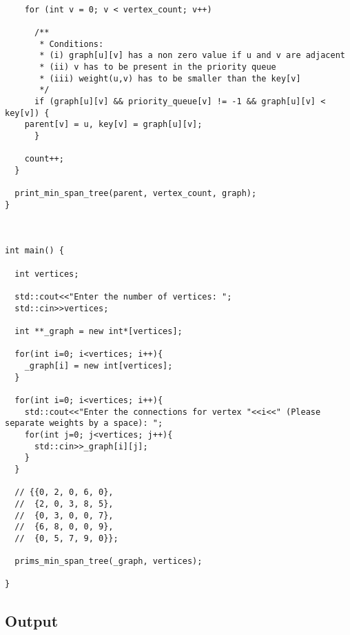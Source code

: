 \documentclass{article}
\begin{document}
\begin{verbatim}
  
    for (int v = 0; v < vertex_count; v++)

      /**
       * Conditions:
       * (i) graph[u][v] has a non zero value if u and v are adjacent
       * (ii) v has to be present in the priority queue
       * (iii) weight(u,v) has to be smaller than the key[v]
       */
      if (graph[u][v] && priority_queue[v] != -1 && graph[u][v] < key[v]) {
	parent[v] = u, key[v] = graph[u][v];
      }
	
    count++;
  } 
  
  print_min_span_tree(parent, vertex_count, graph); 
} 
  
  

int main() {

  int vertices;

  std::cout<<"Enter the number of vertices: ";
  std::cin>>vertices;

  int **_graph = new int*[vertices];

  for(int i=0; i<vertices; i++){
    _graph[i] = new int[vertices];
  }

  for(int i=0; i<vertices; i++){
    std::cout<<"Enter the connections for vertex "<<i<<" (Please separate weights by a space): ";
    for(int j=0; j<vertices; j++){
      std::cin>>_graph[i][j];
    }
  }
  
  // {{0, 2, 0, 6, 0}, 
  //  {2, 0, 3, 8, 5}, 
  //  {0, 3, 0, 0, 7}, 
  //  {6, 8, 0, 0, 9}, 
  //  {0, 5, 7, 9, 0}}; 
  
  prims_min_span_tree(_graph, vertices); 
  
} 
\end{verbatim}

\subsection{Output}

\begin{verbatim}
\end{verbatim}  
\end{document}
